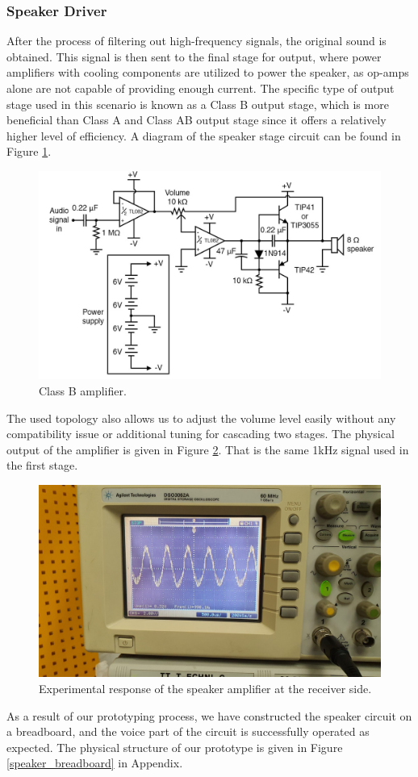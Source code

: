 \documentclass[a4paper,10pt]{IEEEtran}
\begin{document}
\subsubsection{Speaker Driver}
After the process of filtering out high-frequency signals, the original sound is obtained. This signal is then sent to the final stage for output, where power amplifiers with cooling components are utilized to power the speaker, as op-amps alone are not capable of providing enough current. The specific type of output stage used in this scenario is known as a Class B output stage, which is more beneficial than Class A and Class AB output stage since it offers a relatively higher level of efficiency. A diagram of the speaker stage circuit can be found in Figure \ref{classb}.
\begin{figure}[htbp!]
    \centering
    \includegraphics[width = 1\linewidth]{classb.png}
    \caption{Class B amplifier. }
    \label{classb}
\end{figure} 
The used topology also allows us to adjust the volume level easily without any compatibility issue or additional tuning for cascading two stages. The physical output of the amplifier is given in Figure \ref{speaker_osc}. That is the same 1kHz signal used in the first stage.
\begin{figure}[htbp!]
    \centering
    \includegraphics[width = 1\linewidth]{speaker_amplifier.jpeg}
    \caption{Experimental response of the speaker amplifier at the receiver side. }
    \label{speaker_osc}
\end{figure} 
As a result of our prototyping process, we have constructed the speaker circuit on a breadboard, and the voice part of the circuit is successfully operated as expected. The physical structure of our prototype is given in Figure \ref{speaker_breadboard} in Appendix.
\end{document}
